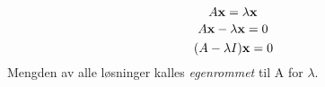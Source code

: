 $$A\mathbf{x} = \lambda\mathbf{x}$$
$$A\mathbf{x} - \lambda\mathbf{x} = 0$$
$$(A - \lambda I)\mathbf{x} = 0$$
Mengden av alle løsninger kalles \emph{egenrommet} til A for $\lambda$.
